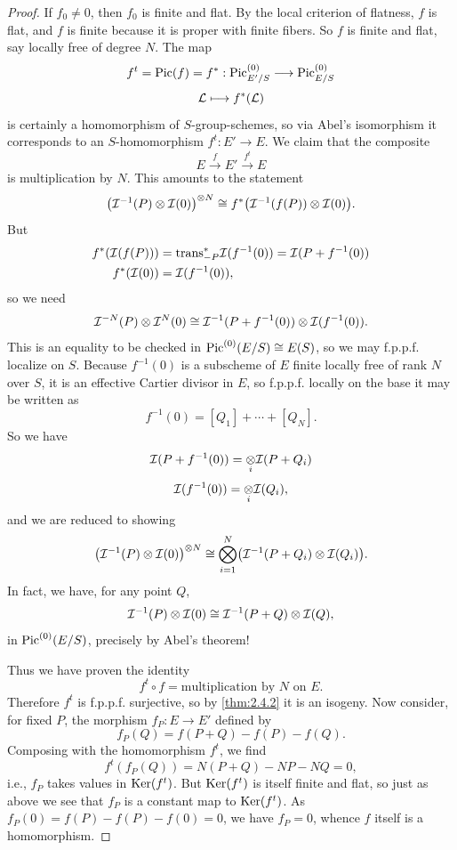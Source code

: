 \begin{proof}
If $f_0 \ne 0$, then $f_0$ is finite and flat. By the local criterion of flatness, $f$ is flat, and $f$ is finite because it is proper with finite fibers. So $f$ is finite and flat, say locally free of degree $N$. The map
\[
f^t = \operatorname{Pic}(f) = f^* : \operatorname{Pic}^{(0)}_{E'/S} \longrightarrow \operatorname{Pic}^{(0)}_{E/S}
\]
\[
\mathcal{L} \longmapsto f^*(\mathcal{L})
\]
is certainly a homomorphism of $S$-group-schemes, so via Abel's isomorphism it corresponds to an $S$-homomorphism $f^t : E' \to E$. We claim that the composite
\[
E \xrightarrow{\ f\ } E' \xrightarrow{\ f^t\ } E
\]
is multiplication by $N$. This amounts to the statement
\[
\bigl(\mathcal{I}^{-1}(P) \otimes \mathcal{I}(0)\bigr)^{\otimes N} \cong f^*\bigl(\mathcal{I}^{-1}(f(P)) \otimes \mathcal{I}(0)\bigr).
\]
But
\[
\begin{aligned}
f^*(\mathcal{I}(f(P))) &= \mathrm{trans}^*_{-P} \mathcal{I}(f^{-1}(0)) = \mathcal{I}(P + f^{-1}(0)) \\
f^*(\mathcal{I}(0)) &= \mathcal{I}(f^{-1}(0)),
\end{aligned}
\]
so we need
\[
\mathcal{I}^{-N}(P) \otimes \mathcal{I}^N(0) \cong \mathcal{I}^{-1}(P + f^{-1}(0)) \otimes \mathcal{I}(f^{-1}(0)).
\]
This is an equality to be checked in $\operatorname{Pic}^{(0)}(E/S) \cong E(S)$, so we may f.p.p.f. localize on $S$. Because $f^{-1}(0)$ is a subscheme of $E$ finite locally free of rank $N$ over $S$, it is an effective Cartier divisor in $E$, so f.p.p.f. locally on the base it may be written as
\[
f^{-1}(0) = [Q_1] + \cdots + [Q_N].
\]
So we have
\[
\mathcal{I}(P + f^{-1}(0)) = \underset{i}{\otimes} \mathcal{I}(P + Q_i)
\]
\[
\mathcal{I}(f^{-1}(0)) = \underset{i}{\otimes} \mathcal{I}(Q_i),
\]
and we are reduced to showing
\[
\bigl(\mathcal{I}^{-1}(P) \otimes \mathcal{I}(0)\bigr)^{\otimes N} \cong \bigotimes_{i=1}^{N} \bigl(\mathcal{I}^{-1}(P + Q_i) \otimes \mathcal{I}(Q_i)\bigr).
\]
In fact, we have, for any point $Q$,
\[
\mathcal{I}^{-1}(P) \otimes \mathcal{I}(0) \cong \mathcal{I}^{-1}(P + Q) \otimes \mathcal{I}(Q),
\]
in $\operatorname{Pic}^{(0)}(E/S)$, precisely by Abel's theorem!

Thus we have proven the identity
\[
f^t \circ f = \text{multiplication by } N \text{ on } E.
\]
Therefore $f^t$ is f.p.p.f. surjective, so by \ref{thm:2.4.2} it is an isogeny. Now consider, for fixed $P$, the morphism $f_P : E \to E'$ defined by
\[
f_P(Q) = f(P + Q) - f(P) - f(Q).
\]
Composing with the homomorphism $f^t$, we find
\[
f^t(f_P(Q)) = N(P + Q) - NP - NQ = 0,
\]
i.e., $f_P$ takes values in $\operatorname{Ker}(f^t)$. But $\operatorname{Ker}(f^t)$ is itself finite and flat, so just as above we see that $f_P$ is a constant map to $\operatorname{Ker}(f^t)$. As $f_P(0) = f(P) - f(P) - f(0) = 0$, we have $f_P = 0$, whence $f$ itself is a homomorphism.
\end{proof}

